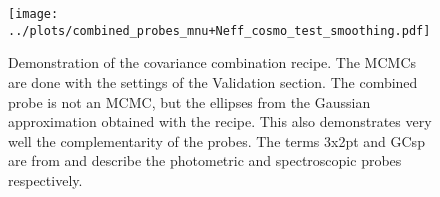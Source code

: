 \documentclass[../main.tex]{subfiles}
\begin{document}
\begin{figure}
    \centering
    \texttt{[image: ../plots/combined\_probes\_mnu+Neff\_cosmo\_test\_smoothing.pdf]}
    \caption{Demonstration of the covariance combination recipe. The MCMCs are done with the settings of the Validation section. The combined probe is not an MCMC, but the ellipses from the Gaussian approximation obtained with the recipe. This also demonstrates very well the complementarity of the \Euclid probes. The terms 3x2pt and GCsp are from \cite{Euclid:2019clj} and describe the photometric and spectroscopic probes respectively.}
    \label{fig:combining-probes}
\end{figure}
\end{document}
